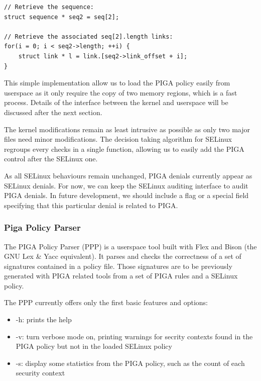 \documentclass[pdftex,a4paper,titlepage,11pt]{article}
\begin{document}
\begin{lstlisting}
// Retrieve the sequence:
struct sequence * seq2 = seq[2];

// Retrieve the associated seq[2].length links:
for(i = 0; i < seq2->length; ++i) {
	struct link * l = link.[seq2->link_offset + i];
}
\end{lstlisting}

\smallskip

This simple implementation allow us to load the PIGA policy easily from
userspace as it only require the copy of two memory regions, which is a fast
process. Details of the interface between the kernel and userspace will be
discussed after the next section.

\bigskip

The kernel modifications remain as least intrusive as possible as only two major
files need minor modifications. The decision taking algorithm for SELinux
regroups every checks in a single function, allowing us to easily add the PIGA
control after the SELinux one.

\bigskip

As all SELinux behaviours remain unchanged, PIGA denials currently appear as
SELinux denials. For now, we can keep the SELinux auditing interface to audit
PIGA denials. In future development, we should include a flag or a special field
specifying that this particular denial is related to PIGA.

\subsubsection{Piga Policy Parser}

The PIGA Policy Parser (PPP) is a userspace tool built with Flex and Bison (the
GNU Lex \& Yacc equivalent). It parses and checks the correctness of a set of
signatures contained in a policy file. Those signatures are to be previously
generated with PIGA related tools from a set of PIGA rules and a SELinux policy.

The PPP currently offers only the first basic features and options:
\begin{itemize}
	\item -h: prints the help
	\item -v: turn verbose mode on, printing warnings for secrity contexts found
in the PIGA policy but not in the loaded SELinux policy
	\item -s: display some statistics from the PIGA policy, such as the count of
each security context
\end{itemize}
\end{document}
